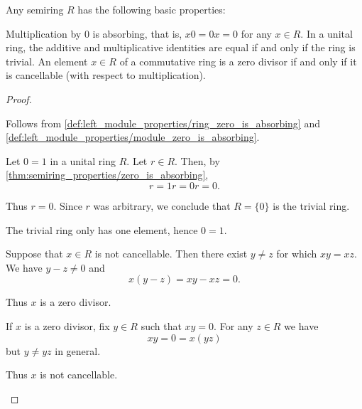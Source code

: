 \begin{proposition}\label{thm:semiring_properties}
  Any semiring \( R \) has the following basic properties:
  \begin{thmenum}
     Multiplication by \( 0 \) is absorbing, that is, \( x0 = 0x = 0 \) for any \( x \in R \).
     In a unital ring, the additive and multiplicative identities are equal if and only if the ring is trivial.
     An element \( x \in R \) of a commutative ring is a zero divisor if and only if it is cancellable (with respect to multiplication).
  \end{thmenum}
\end{proposition}
\begin{proof}\mbox{}
  \begin{itemize}
     Follows from \cref{def:left_module_properties/ring_zero_is_absorbing} and \cref{def:left_module_properties/module_zero_is_absorbing}.
    \mbox{}
    \begin{description}
      \Implies Let \( 0 = 1 \) in a unital ring \( R \). Let \( r \in R \). Then, by \cref{thm:semiring_properties/zero_is_absorbing},
      \begin{equation*}
        r = 1r = 0r = 0.
      \end{equation*}

      Thus \( r = 0 \). Since \( r \) was arbitrary, we conclude that \( R = \{ 0 \} \) is the trivial ring.

      \ImpliedBy The trivial ring only has one element, hence \( 0 = 1 \).
    \end{description}

    \mbox{}
    \begin{description}
      \Implies Suppose that \( x \in R \) is not cancellable. Then there exist \( y \neq z \) for which \( xy = xz \). We have \( y - z \neq 0 \) and
      \begin{equation*}
        x(y - z) = xy - xz = 0.
      \end{equation*}

      Thus \( x \) is a zero divisor.

      \ImpliedBy If \( x \) is a zero divisor, fix \( y \in R \) such that \( xy = 0 \). For any \( z \in R \) we have
      \begin{equation*}
        xy = 0 = x(yz)
      \end{equation*}
      but \( y \neq yz \) in general.

      Thus \( x \) is not cancellable.
    \end{description}
  \end{itemize}
\end{proof}

